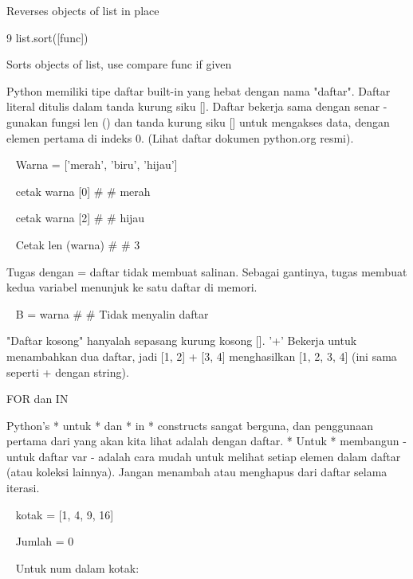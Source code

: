 \vspace{12pt}
Reverses objects of list in place \par
9 \hspace*{0.5in} list.sort([func]) \par
\vspace{12pt}
Sorts objects of list, use compare func if given \par
\vspace{12pt}
Python memiliki tipe daftar built-in yang hebat dengan nama "daftar". Daftar literal ditulis dalam tanda kurung siku []. Daftar bekerja sama dengan senar - gunakan fungsi len () dan tanda kurung siku [] untuk mengakses data, dengan elemen pertama di indeks 0. (Lihat daftar dokumen python.org resmi). \par
\vspace{12pt}
~ Warna = ['merah', 'biru', 'hijau'] \par
~ cetak warna [0]  $  \#  $ $  \#  $ merah \par
~ cetak warna [2]  $  \#  $ $  \#  $ hijau \par
~ Cetak len (warna)  $  \#  $ $  \#  $ 3 \par
\vspace{12pt}
\vspace{12pt}
  \par
Tugas dengan = daftar tidak membuat salinan. Sebagai gantinya, tugas membuat kedua variabel menunjuk ke satu daftar di memori. \par
\vspace{12pt}
~ B = warna  $  \#  $ $  \#  $ Tidak menyalin daftar \par
  \par
"Daftar kosong" hanyalah sepasang kurung kosong []. '+' Bekerja untuk menambahkan dua daftar, jadi [1, 2] + [3, 4] menghasilkan [1, 2, 3, 4] (ini sama seperti + dengan string). \par
FOR dan IN \par
\vspace{12pt}
Python's * untuk * dan * in * constructs sangat berguna, dan penggunaan pertama dari yang akan kita lihat adalah dengan daftar. * Untuk * membangun - untuk daftar var - adalah cara mudah untuk melihat setiap elemen dalam daftar (atau koleksi lainnya). Jangan menambah atau menghapus dari daftar selama iterasi. \par
\vspace{12pt}
~ kotak = [1, 4, 9, 16] \par
~ Jumlah = 0 \par
~ Untuk num dalam kotak: \par
